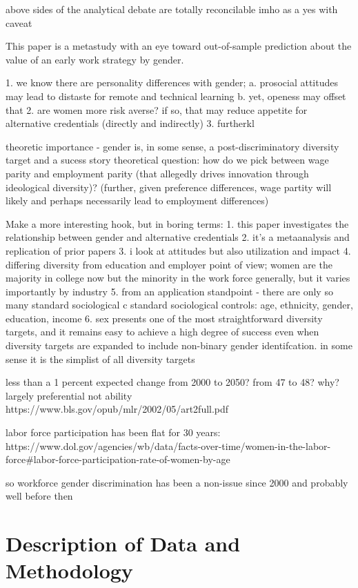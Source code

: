\documentclass[review]{elsarticle}
\begin{document}
above sides of the analytical debate are totally reconcilable imho as a yes with caveat


This paper is a metastudy with an eye toward out-of-sample prediction about the value of an early work strategy by gender.

1. we know there are personality differences with gender;
a. prosocial attitudes may lead to distaste for remote and technical learning
b. yet, openess may offset that
2. are women more risk averse? if so, that may reduce appetite for alternative credentials (directly and indirectly)
3. furtherkl


theoretic importance - gender is, in some sense, a post-discriminatory diversity target and a sucess story
theoretical question: how do we pick between wage parity and employment parity (that allegedly drives innovation through ideological diversity)?
(further, given preference differences, wage partity will likely and perhaps necessarily lead to employment differences)

Make a more interesting hook, but in boring terms:
1. this paper investigates the relationship between gender and alternative credentials
2. it's a metaanalysis and replication of prior papers
3. i look at attitudes but also utilization and impact
4. differing diversity from education and employer point of view;
women are the majority in college now but the minority in the work force generally,
but it varies importantly by industry
5. from an application standpoint - there are only so many standard sociological c
standard sociological controls: age, ethnicity, gender, education, income
6. sex presents one of the most straightforward diversity targets,
and it remains easy to achieve a high degree of success even when diversity targets are expanded to include non-binary gender identifcation.
in some sense it is the simplist of all diversity targets


less than a 1 percent expected change from 2000 to 2050? from 47 to 48? why? largely preferential not ability
https://www.bls.gov/opub/mlr/2002/05/art2full.pdf

labor force participation has been flat for 30 years:
https://www.dol.gov/agencies/wb/data/facts-over-time/women-in-the-labor-force#labor-force-participation-rate-of-women-by-age

so workforce gender discrimination has been a non-issue since 2000 and probably well before then

\section{Description of Data and Methodology}
\end{document}
